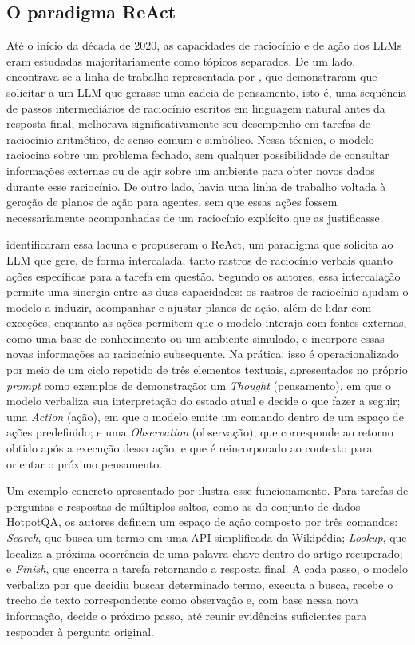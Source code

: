 \subsection{O paradigma ReAct}
\label{subsec:react}

Até o início da década de 2020, as capacidades de raciocínio e de ação dos LLMs eram estudadas majoritariamente como tópicos separados. De um lado, encontrava-se a linha de trabalho representada por \citet{wei2022cot}, que demonstraram que solicitar a um LLM que gerasse uma cadeia de pensamento, isto é, uma sequência de passos intermediários de raciocínio escritos em linguagem natural antes da resposta final, melhorava significativamente seu desempenho em tarefas de raciocínio aritmético, de senso comum e simbólico. Nessa técnica, o modelo raciocina sobre um problema fechado, sem qualquer possibilidade de consultar informações externas ou de agir sobre um ambiente para obter novos dados durante esse raciocínio. De outro lado, havia uma linha de trabalho voltada à geração de planos de ação para agentes, sem que essas ações fossem necessariamente acompanhadas de um raciocínio explícito que as justificasse.

\citet{yao2023react} identificaram essa lacuna e propuseram o ReAct, um paradigma que solicita ao LLM que gere, de forma intercalada, tanto rastros de raciocínio verbais quanto ações específicas para a tarefa em questão. Segundo os autores, essa intercalação permite uma sinergia entre as duas capacidades: os rastros de raciocínio ajudam o modelo a induzir, acompanhar e ajustar planos de ação, além de lidar com exceções, enquanto as ações permitem que o modelo interaja com fontes externas, como uma base de conhecimento ou um ambiente simulado, e incorpore essas novas informações ao raciocínio subsequente. Na prática, isso é operacionalizado por meio de um ciclo repetido de três elementos textuais, apresentados no próprio \textit{prompt} como exemplos de demonstração: um \textit{Thought} (pensamento), em que o modelo verbaliza sua interpretação do estado atual e decide o que fazer a seguir; uma \textit{Action} (ação), em que o modelo emite um comando dentro de um espaço de ações predefinido; e uma \textit{Observation} (observação), que corresponde ao retorno obtido após a execução dessa ação, e que é reincorporado ao contexto para orientar o próximo pensamento.

Um exemplo concreto apresentado por \citet{yao2023react} ilustra esse funcionamento. Para tarefas de perguntas e respostas de múltiplos saltos, como as do conjunto de dados HotpotQA, os autores definem um espaço de ação composto por três comandos: \textit{Search}, que busca um termo em uma API simplificada da Wikipédia; \textit{Lookup}, que localiza a próxima ocorrência de uma palavra-chave dentro do artigo recuperado; e \textit{Finish}, que encerra a tarefa retornando a resposta final. A cada passo, o modelo verbaliza por que decidiu buscar determinado termo, executa a busca, recebe o trecho de texto correspondente como observação e, com base nessa nova informação, decide o próximo passo, até reunir evidências suficientes para responder à pergunta original.

